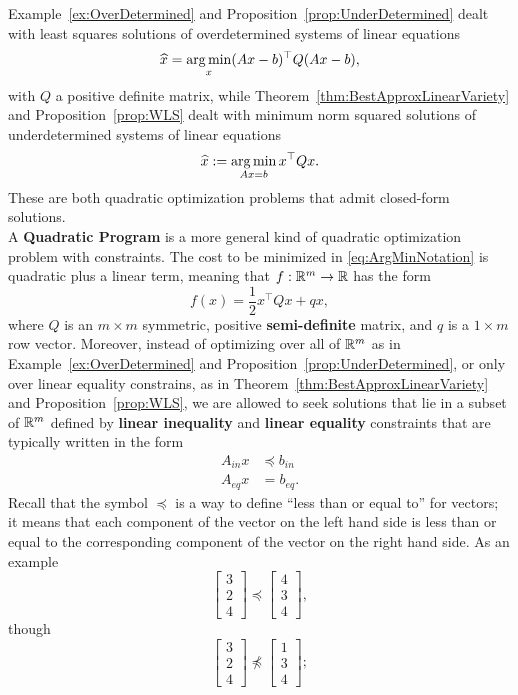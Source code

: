 Example~\ref{ex:OverDetermined} and Proposition~\ref{prop:UnderDetermined} dealt with least squares solutions of overdetermined systems of linear equations 
$$\widehat{x} = \operatorname*{arg\,min}_{x} (A x -b)^\top Q (Ax-b), $$
 with $Q$ a positive definite matrix, while Theorem~\ref{thm:BestApproxLinearVariety} and Proposition~\ref{prop:WLS} dealt with minimum norm squared solutions of underdetermined systems of linear equations 
  $$\widehat{x}:= \operatorname*{arg\,min}_{Ax=b} x^\top Q x. $$
  These are both quadratic optimization problems that admit closed-form solutions. \\

A \textbf{Quadratic Program} is a more general kind of quadratic optimization problem with constraints. The cost to be minimized in \eqref{eq:ArgMinNotation} is quadratic plus a linear term, meaning that $f:\mathbb R^m \to \mathbb R $ has the form
\begin{equation}
    \label{eq:QPconst}
    f(x) = \frac{1}{2} x^\top Q x + q x, 
\end{equation}
where $Q$ is an $m\times m$ symmetric, positive \textbf{semi-definite} matrix, and $q$ is a $1 \times m$ row vector. Moreover, instead of optimizing over all of $\mathbb R^m$ as in Example~\ref{ex:OverDetermined} and Proposition~\ref{prop:UnderDetermined}, or only over linear equality constrains, as in Theorem~\ref{thm:BestApproxLinearVariety} and Proposition~\ref{prop:WLS}, we are allowed to seek solutions that lie in a subset of $\mathbb R^m$ defined by \textbf{linear inequality} and \textbf{linear equality} constraints that are typically written in the form
\begin{align}
\label{eq:QPconstraintsInequality}
   A_{in} x & \preceq b_{in} \\
   \label{eq:QPconstraintsEquality}
   A_{eq} x & = b_{eq}.
\end{align}
Recall that the symbol $\preceq$ is a way to define ``less than or equal to'' for vectors; it means that each component of the vector on the left hand side is less than or equal to the corresponding component of the vector on the right hand side. As an example 
$$\begin{bmatrix}3 \\ 2 \\ 4\end{bmatrix} \preceq \begin{bmatrix}4 \\ 3 \\ 4\end{bmatrix},  $$
   though 
$$\begin{bmatrix}3 \\ 2 \\ 4\end{bmatrix} \not \preceq \begin{bmatrix}1 \\ 3 \\ 4\end{bmatrix};  $$ 

